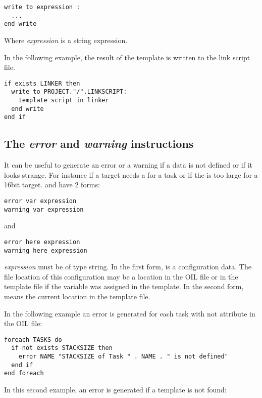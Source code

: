 \begin{lstlisting}[frame=single]
write to expression :
  ...
end write
\end{lstlisting}

Where {\em expression} is a string expression.

In the following example, the result of the  template is written to the link script file.

\begin{lstlisting}[frame=single]
if exists LINKER then
  write to PROJECT."/".LINKSCRIPT:
    template script in linker
  end write
end if
\end{lstlisting}


\subsection{The {\em error} and {\em warning} instructions}

It can be useful to generate an error or a warning if a data is not defined or if it looks strange. For instance if a target needs a  for a task or if the  is too large for a 16bit target.  and  have 2 forms:

\begin{lstlisting}[frame=single]
error var expression
warning var expression
\end{lstlisting}

and

\begin{lstlisting}[frame=single]
error here expression
warning here expression
\end{lstlisting}

{\em expression} must be of type string. In the first form,  is a configuration data. The file location of this configuration may be a location in the OIL file or in the template file if the variable was assigned in the template. In the second form,  means the current location in the template file.

In the following example an error is generated for each task with not  attribute in the OIL file:

\begin{lstlisting}[frame=single]
foreach TASKS do
  if not exists STACKSIZE then
    error NAME "STACKSIZE of Task " . NAME . " is not defined"
  end if
end foreach
\end{lstlisting}

In this second example, an error is generated if a template is not found:

